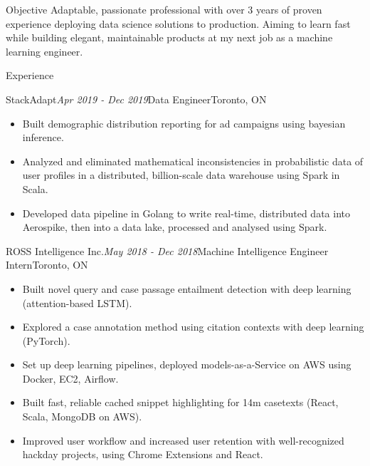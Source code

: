 \documentclass{resume} %
\begin{document}
\begin{rSection}{Objective}
Adaptable, passionate professional with over 3 years of proven experience deploying data science solutions to production. Aiming to learn fast while building elegant, maintainable products at my next job as a machine learning engineer.
\end{rSection}

\begin{rSection}{Experience}
\begin{rSubsection}{StackAdapt}{\em Apr 2019 - Dec 2019}{Data Engineer}{Toronto, ON}
\vspace{-1mm}
\begin{itemize}
    \item Built demographic distribution reporting for ad campaigns using bayesian inference.
    \item Analyzed and eliminated mathematical inconsistencies in probabilistic data of user profiles in a distributed, billion-scale data warehouse using Spark in Scala.
    \item Developed data pipeline in Golang to write real-time, distributed data into Aerospike, then into a data lake, processed and analysed using Spark.
\end{itemize}

\end{rSubsection}

\begin{rSubsection}{ROSS Intelligence Inc.}{\em May 2018 - Dec 2018}{Machine Intelligence Engineer Intern}{Toronto, ON}
\vspace{-1mm}
\begin{itemize}
    \item Built novel query and case passage entailment detection with deep learning (attention-based LSTM).
    \item Explored a case annotation method using citation contexts with deep learning (PyTorch).
    \item Set up deep learning pipelines, deployed models-as-a-Service on AWS using Docker, EC2, Airflow.
    \item Built fast, reliable cached snippet highlighting for 14m casetexts (React, Scala, MongoDB on AWS).
    \item Improved user workflow and increased user retention with well-recognized hackday projects, using Chrome Extensions and React.
\end{itemize}


\end{rSubsection}
\end{rSection}
\end{document}
